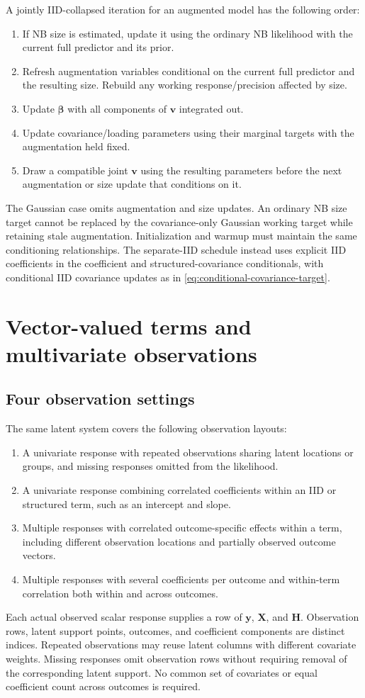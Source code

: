 \documentclass[11pt]{article}
\newcommand{\by}{\bm{y}}
\newcommand{\bv}{\bm{v}}
\newcommand{\bbeta}{\bm{\beta}}
\newcommand{\bH}{\bm{H}}
\newcommand{\bX}{\bm{X}}
\begin{document}
A jointly IID-collapsed iteration for an augmented model has the following order:
\begin{enumerate}
\item If NB size is estimated, update it using the ordinary NB likelihood with
the current full predictor and its prior.
\item Refresh augmentation variables conditional on the current full predictor
and the resulting size. Rebuild any working response/precision affected by size.
\item Update $\bbeta$ with all components of $\bv$ integrated out.
\item Update covariance/loading parameters using their marginal targets with
the augmentation held fixed.
\item Draw a compatible joint $\bv$ using the resulting parameters before the
next augmentation or size update that conditions on it.
\end{enumerate}
The Gaussian case omits augmentation and size updates. An ordinary NB size target
cannot be replaced by the covariance-only Gaussian working target while retaining
stale augmentation. Initialization and warmup must maintain the same conditioning
relationships. The separate-IID schedule instead uses explicit IID coefficients
in the coefficient and structured-covariance conditionals, with conditional IID
covariance updates as in \eqref{eq:conditional-covariance-target}.

\section{Vector-valued terms and multivariate observations}
\subsection{Four observation settings}
The same latent system covers the following observation layouts:
\begin{enumerate}
\item A univariate response with repeated observations sharing latent locations
or groups, and missing responses omitted from the likelihood.
\item A univariate response combining correlated coefficients within an IID or
structured term, such as an intercept and slope.
\item Multiple responses with correlated outcome-specific effects within a term,
including different observation locations and partially observed outcome vectors.
\item Multiple responses with several coefficients per outcome and within-term
correlation both within and across outcomes.
\end{enumerate}
Each actual observed scalar response supplies a row of $\by$, $\bX$, and $\bH$.
Observation rows, latent support points, outcomes, and coefficient components
are distinct indices. Repeated observations may reuse latent columns with
different covariate weights. Missing responses omit observation rows without
requiring removal of the corresponding latent support. No common set of
covariates or equal coefficient count across outcomes is required.
\end{document}
